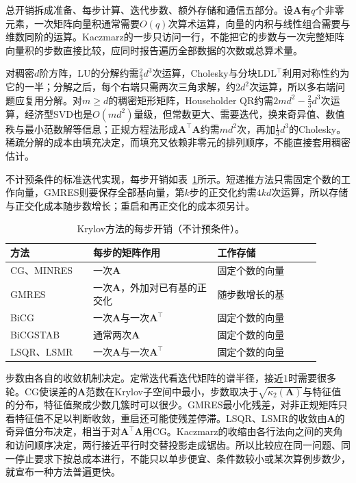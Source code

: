 总开销拆成准备、每步计算、迭代步数、额外存储和通信五部分。设$\bm A$有$q$个非零元素，一次矩阵向量积通常需要$O(q)$次算术运算，向量的内积与线性组合需要与维数同阶的运算。Kaczmarz的一步只访问一行，不能把它的步数与一次完整矩阵向量积的步数直接比较，应同时报告遍历全部数据的次数或总算术量。

对稠密$d$阶方阵，LU的分解约需$\tfrac23d^3$次运算，Cholesky与分块$\mathrm{LDL}^\top$利用对称性约为它的一半；分解之后，每个右端只需两次三角求解，约$2d^2$次运算，所以多右端问题应复用分解。对$m\geq d$的稠密矩形矩阵，Householder QR约需$2md^2-\tfrac23d^3$次运算，经济型SVD也是$O(md^2)$量级，但常数更大、需要迭代，换来奇异值、数值秩与最小范数解等信息；正规方程法形成$\bm A^\top\bm A$约需$md^2$次，再加$\tfrac13d^3$的Cholesky。稀疏分解的成本由填充决定，而填充又依赖非零元的排列顺序，不能直接套用稠密估计。

不计预条件的标准迭代实现，每步开销如表~\ref{tab:ls-iterative-cost}所示。短递推方法只需固定个数的工作向量，GMRES则要保存全部基向量，第$k$步的正交化约需$4kd$次运算，所以存储与正交化成本随步数增长；重启和再正交化的成本须另计。

\begin{table}[htbp]
\centering
\small
\begin{tabular}{@{}p{0.24\linewidth}p{0.36\linewidth}p{0.3\linewidth}@{}}
\toprule
方法 & 每步的矩阵作用 & 工作存储\\
\midrule
CG、MINRES & 一次$\bm A$ & 固定个数的向量\\
GMRES & 一次$\bm A$，外加对已有基的正交化 & 随步数增长的基\\
BiCG & 一次$\bm A$与一次$\bm A^\top$ & 固定个数的向量\\
BiCGSTAB & 通常两次$\bm A$ & 固定个数的向量\\
LSQR、LSMR & 一次$\bm A$与一次$\bm A^\top$ & 固定个数的向量\\
\bottomrule
\end{tabular}
\caption{Krylov方法的每步开销（不计预条件）。}
\label{tab:ls-iterative-cost}
\end{table}

步数由各自的收敛机制决定。定常迭代看迭代矩阵的谱半径，接近$1$时需要很多轮。CG使误差的$\bm A$范数在Krylov子空间中最小，步数取决于$\sqrt{\kappa_2(\bm A)}$与特征值的分布，特征值聚成少数几簇时可以很少。GMRES最小化残差，对非正规矩阵只看特征值不足以判断收敛，重启还可能使残差停滞。LSQR、LSMR的收敛由$\bm A$的奇异值分布决定，相当于对$\bm A^\top\bm A$用CG。Kaczmarz的收缩由各行法向之间的夹角和访问顺序决定，两行接近平行时交替投影走成锯齿。所以比较应在同一问题、同一停止要求下按总成本进行，不能只以单步便宜、条件数较小或某次算例步数少，就宣布一种方法普遍更快。


